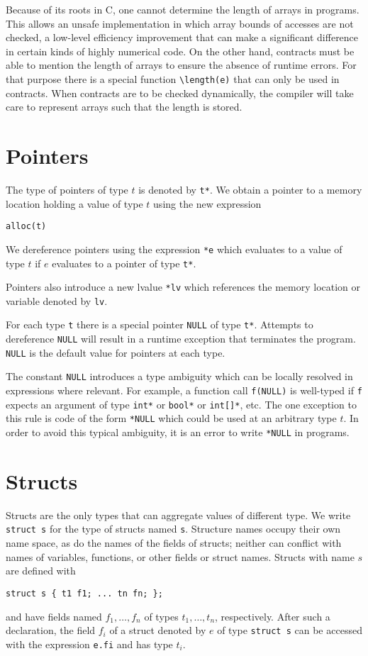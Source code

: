\documentclass[11pt]{article}
\begin{document}
Because of its roots in C, one cannot determine the length of arrays
in programs.  This allows an unsafe implementation in which array
bounds of accesses are not checked, a low-level efficiency improvement
that can make a significant difference in certain kinds of highly
numerical code.  On the other hand, contracts must be able to mention
the length of arrays to ensure the absence of runtime errors.  For
that purpose there is a special function \verb'\length(e)' that can
only be used in contracts.  When contracts are to be checked
dynamically, the compiler will take care to represent arrays such
that the length is stored.

\section{Pointers}

The type of pointers of type $t$ is denoted by \verb't*'.
We obtain a pointer to a memory location holding a
value of type $t$ using the new expression
\begin{verbatim}
alloc(t)
\end{verbatim}
We dereference pointers using the expression \verb'*e'
which evaluates to a value of type $t$ if
$e$ evaluates to a pointer of type \verb't*'.

Pointers also introduce a new lvalue \verb'*lv' which references the
memory location or variable denoted by \verb'lv'.

For each type \verb't' there is a special pointer \verb'NULL'
of type \verb't*'.  Attempts to dereference \verb'NULL' will result
in a runtime exception that terminates the program.  \verb'NULL'
is the default value for pointers at each type.

The constant \verb'NULL' introduces a type ambiguity which can
be locally resolved in expressions where relevant.  For example,
a function call \verb'f(NULL)' is well-typed if \verb'f'
expects an argument of type \verb'int*' or \verb'bool*' or
\verb'int[]*', etc.  The one exception to this rule is code of
the form \verb'*NULL' which could be used at an arbitrary type
$t$.  In order to avoid this typical ambiguity, it is an error
to write \verb'*NULL' in programs.

\section{Structs}

Structs are the only types that can aggregate values of different
type.  We write \verb'struct s' for the type of structs named
\verb's'.  Structure names occupy their own name space, as do
the names of the fields of structs; neither can conflict
with names of variables, functions, or other fields or struct
names.  Structs with name $s$ are defined with
\begin{verbatim}
struct s { t1 f1; ... tn fn; };
\end{verbatim}
and have fields named $f_1, \ldots, f_n$ of types $t_1, \ldots, t_n$,
respectively.  After such a declaration, the field $f_i$ of a struct
denoted by $e$ of type \verb'struct s' can be accessed with the
expression \verb'e.fi' and has type $t_i$.
\end{document}
